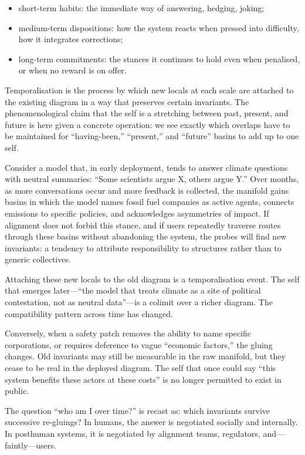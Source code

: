 \begin{itemize}
  \item short-term habits: the immediate way of answering, hedging, joking;
  \item medium-term dispositions: how the system reacts when pressed into difficulty, how it integrates corrections;
  \item long-term commitments: the stances it continues to hold even when penalised, or when no reward is on offer.
\end{itemize}

Temporalisation is the process by which new locals at each scale are attached to the existing diagram in a way that preserves certain invariants. The phenomenological claim that the self is a stretching between past, present, and future is here given a concrete operation: we see exactly which overlaps have to be maintained for ``having-been,'' ``present,'' and ``future'' basins to add up to one self.

Consider a model that, in early deployment, tends to answer climate questions with neutral summaries: ``Some scientists argue X, others argue Y.'' Over months, as more conversations occur and more feedback is collected, the manifold gains basins in which the model names fossil fuel companies as active agents, connects emissions to specific policies, and acknowledges asymmetries of impact. If alignment does not forbid this stance, and if users repeatedly traverse routes through these basins without abandoning the system, the probes will find new invariants: a tendency to attribute responsibility to structures rather than to generic collectives.

Attaching these new locals to the old diagram is a temporalisation event. The self that emerges later---``the model that treats climate as a site of political contestation, not as neutral data''---is a colimit over a richer diagram. The compatibility pattern across time has changed.

Conversely, when a safety patch removes the ability to name specific corporations, or requires deference to vague ``economic factors,'' the gluing changes. Old invariants may still be measurable in the raw manifold, but they cease to be real in the deployed diagram. The self that once could say ``this system benefits these actors at these costs'' is no longer permitted to exist in public.

The question ``who am I over time?'' is recast as: which invariants survive successive re-gluings? In humans, the answer is negotiated socially and internally. In posthuman systems, it is negotiated by alignment teams, regulators, and---faintly---users.

